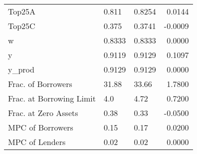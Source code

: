 \begin{table}
\begin{tabular}{lllr}
                  Top25A &   0.811 &   0.8254 &  0.0144 \\
                  Top25C &   0.375 &   0.3741 & -0.0009 \\
                       w &  0.8333 &   0.8333 &  0.0000 \\
                       y &  0.9119 &   0.9129 &  0.1097 \\
                  y\_prod &  0.9129 &   0.9129 &  0.0000 \\
      Frac. of Borrowers &   31.88 &    33.66 &  1.7800 \\
Frac. at Borrowing Limit &     4.0 &     4.72 &  0.7200 \\
    Frac. at Zero Assets &    0.38 &     0.33 & -0.0500 \\
        MPC of Borrowers &    0.15 &     0.17 &  0.0200 \\
          MPC of Lenders &    0.02 &     0.02 &  0.0000 \\
\bottomrule
\end{tabular}
\end{table}
